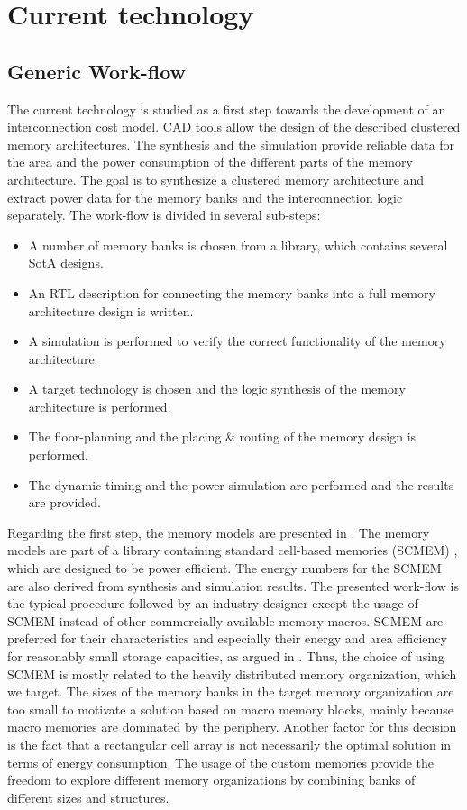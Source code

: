 \section{Current technology}
\label{Current}

\subsection{Generic Work-flow}

The current technology is studied as a first step towards the development of an interconnection cost model. 
CAD tools allow the design of the described clustered memory architectures.
The synthesis and the simulation provide reliable data for the area and the power consumption of the different parts of the memory architecture.
The goal is to synthesize a clustered memory architecture and extract power data for the memory banks and the interconnection logic separately.
The work-flow is divided in several sub-steps:

\begin{itemize}
	\item A number of memory banks is chosen from a library, which contains several SotA designs.
	\item An RTL description for connecting the memory banks into a full memory architecture design is written.
	\item A simulation is performed to verify the correct functionality of the memory architecture.
	\item A target technology is chosen and the logic synthesis of the memory architecture is performed.
	\item The floor-planning and the placing \& routing of the memory design is performed.
	\item The dynamic timing and the power simulation are performed and the results are provided.
\end{itemize}

Regarding the first step, the memory models are presented in \cite{filippopoulos2013exploration}.
The memory models are part of a library containing standard cell-based memories (SCMEM) \cite{Mei11}, which are designed to be power efficient. 
The energy numbers for the SCMEM are also derived from synthesis and simulation results.
The presented work-flow is the typical procedure followed by an industry designer except the usage of SCMEM instead of other commercially available memory macros.
SCMEM are preferred for their characteristics and especially their energy and area efficiency for reasonably small storage capacities, as argued in \cite{Mei10}. 
Thus, the choice of using SCMEM is mostly related to the heavily distributed memory organization, which we target. 
The sizes of the memory banks in the target memory organization are too small to motivate a solution based on macro memory blocks, mainly because macro memories are dominated by the periphery.
Another factor for this decision is the fact that a rectangular cell array is not necessarily the optimal solution in terms of energy consumption.
The usage of the custom memories provide the freedom to explore different memory organizations by combining banks of different sizes and structures.  

